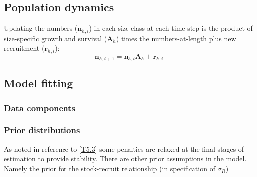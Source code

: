 \documentclass[12pt,letterpaper]{article}
\begin{document}

    \subsection*{Population dynamics} %
    \label{sub:population_dynamics}
    Updating the numbers ($\bm{n}_{h,i}$) in each size-class at each time step is the product of size-specific growth and survival ($\bm{A}_h$) times the numbers-at-length plus new recruitment ($\bm{r}_{h,i}$):
    \begin{equation}\label{eq:update_numbers_at_length}
      \bm{n}_{h,i+1} = \bm{n}_{h,i} \bm{A}_h + \bm{r}_{h,i}
    \end{equation}
    
    \subsection*{Model fitting} %
    \label{sub:Model fitting}
    \subsubsection*{Data components}
    \label{subsub:Data components}
    \subsubsection*{Prior distributions}
    \label{subsub:Prior distributions}
    As noted in reference to \eqref{T5.3} some penalties are relaxed at the final stages of estimation to provide stability. There are other prior assumptions in the model. Namely the prior for the stock-recruit relationship (in specification of $\sigma_{R}$)
\end{document}

